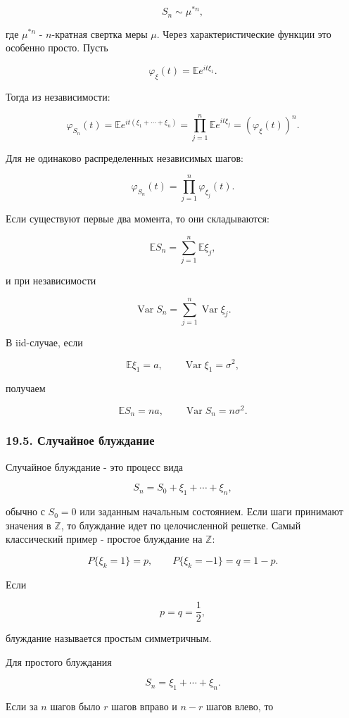 \documentclass[
  11pt,
  a4paper,
]{article}
\begin{document}
\[
S_n\sim \mu^{*n},
\]

где \(\mu^{*n}\) - \(n\)-кратная свертка меры \(\mu\). Через
характеристические функции это особенно просто. Пусть

\[
\varphi_\xi(t)=\mathbb E e^{it\xi_1}.
\]

Тогда из независимости:

\[
\varphi_{S_n}(t)
=
\mathbb E e^{it(\xi_1+\cdots+\xi_n)}
=
\prod_{j=1}^n\mathbb E e^{it\xi_j}
=
\left(\varphi_\xi(t)\right)^n.
\]

Для не одинаково распределенных независимых шагов:

\[
\varphi_{S_n}(t)=\prod_{j=1}^n\varphi_{\xi_j}(t).
\]

Если существуют первые два момента, то они складываются:

\[
\mathbb ES_n
=
\sum_{j=1}^n\mathbb E\xi_j,
\]

и при независимости

\[
\operatorname{Var}S_n
=
\sum_{j=1}^n\operatorname{Var}\xi_j.
\]

В iid-случае, если

\[
\mathbb E\xi_1=a,
\qquad
\operatorname{Var}\xi_1=\sigma^2,
\]

получаем

\[
\mathbb ES_n=na,
\qquad
\operatorname{Var}S_n=n\sigma^2.
\]

\subsubsection{19.5. Случайное
блуждание}\label{ux441ux43bux443ux447ux430ux439ux43dux43eux435-ux431ux43bux443ux436ux434ux430ux43dux438ux435}

Случайное блуждание - это процесс вида

\[
S_n=S_0+\xi_1+\cdots+\xi_n,
\]

обычно с \(S_0=0\) или заданным начальным состоянием. Если шаги
принимают значения в \(\mathbb Z\), то блуждание идет по целочисленной
решетке. Самый классический пример - простое блуждание на \(\mathbb Z\):

\[
P\{\xi_k=1\}=p,
\qquad
P\{\xi_k=-1\}=q=1-p.
\]

Если

\[
p=q=\frac12,
\]

блуждание называется простым симметричным.

Для простого блуждания

\[
S_n=\xi_1+\cdots+\xi_n.
\]

Если за \(n\) шагов было \(r\) шагов вправо и \(n-r\) шагов влево, то
\end{document}
